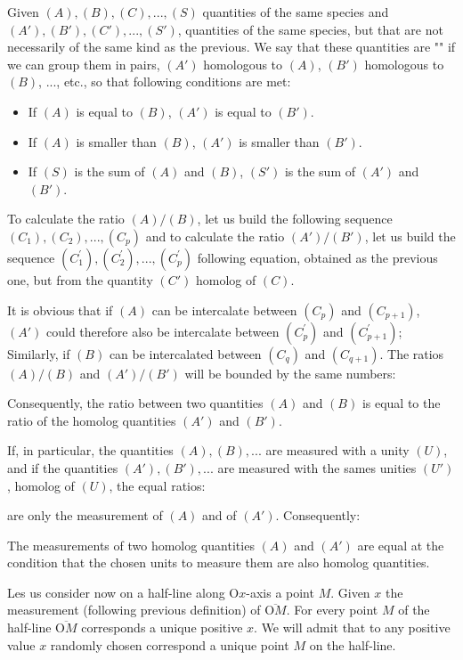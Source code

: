 	Given $(A), (B), (C), ..., (S)$ quantities of the same species and $(A'), (B'), (C'), ..., (S ')$, quantities of the same species, but that are not necessarily of the same kind as the previous. We say that these quantities are "" if we can group them in pairs, $(A ')$ homologous to $(A)$, $(B')$ homologous to $(B)$, ..., etc., so that following conditions are met:
	\begin{itemize}
		\item If $(A)$ is equal to $(B)$, $(A')$ is equal to $(B')$.
		\item If $(A)$ is smaller than $(B)$, $(A')$ is smaller than $(B')$.
		\item If $(S)$ is the sum of $(A)$ and $(B)$, $(S')$ is the sum of $(A')$ and $(B')$.
	\end{itemize}
	To calculate the ratio $(A) / (B)$, let us build the following sequence $(C_1),(C_2),...,(C_p)$ and to calculate the ratio $(A')/(B')$, let us build the sequence  $(C_1^{\prime}),(C_2^{\prime}),...,(C_p^{\prime})$ following equation, obtained as the previous one, but from the quantity $(C ')$ homolog of $(C)$.
	
	It is obvious that if $(A)$ can be intercalate between $(C_p)$ and $(C_{p+1})$, $(A')$ could therefore also be intercalate between $(C_p^{\prime})$ and $(C_{p+1}^{\prime})$; Similarly, if $(B)$ can be intercalated between $(C_q)$ and $(C_{q+1})$. The ratios $(A) / (B)$ and $(A ') / (B')$ will be bounded by the same numbers:
		
	Consequently, the ratio between two quantities $(A)$ and $(B)$ is equal to the ratio of the homolog quantities $(A')$ and $(B')$.

	If, in particular, the quantities $(A),(B),...$ are measured with a unity $(U)$, and if the quantities $(A'),(B'),...$ are measured with the sames unities $(U')$, homolog of $(U)$, the equal ratios:
	
	are only the measurement of $(A)$ and of $(A')$. Consequently:
	
	The measurements of two homolog quantities $(A)$ and $(A')$ are equal at the condition that the chosen units to measure them are also homolog quantities.

	Les us consider now on a half-line along $\text{O}x$-axis a point $M$. Given $x$ the measurement (following previous definition) of $\overline{\text{O}M}$. For every point $M$ of the half-line $\overline{\text{O}M}$ corresponds a unique positive $x$. We will admit that to any positive value $x$ randomly chosen correspond a unique point $M$ on the half-line.
	
